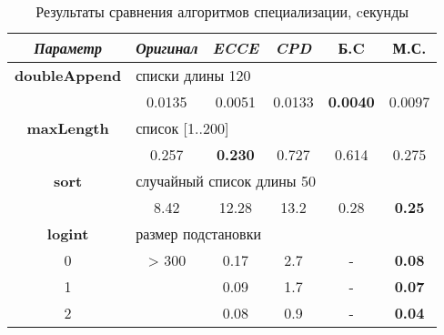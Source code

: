 \begin{table}[h!]
\center
\begin{tabular}{|c|c|c|c|c|c|}
\hline
{\it Параметр} & {\it Оригинал} & {\it ECCE }  & {\it CPD} & {\bf Б.C} & {\bf М.С.} \\ \hline
{\bf doubleAppend} & \multicolumn{5}{|l|}{списки длины 120 } \\ \hline
                   & 0.0135 & 0.0051 & 0.0133 & {\bf 0.0040} & 0.0097 \\ \hline


{\bf maxLength} & \multicolumn{5}{|l|}{список [1..200]} \\ \hline

                & 0.257 & {\bf 0.230} & 0.727 & 0.614 & 0.275 \\ \hline


{\bf sort} & \multicolumn{5}{|l|}{случайный список длины 50 } \\ \hline
         & 8.42     & 12.28 & 13.2 & 0.28  & {\bf 0.25} \\ \hline


{\bf logint} & \multicolumn{5}{|l|}{размер подстановки} \\ \hline
0 & > 300    & 0.17  & 2.7  & -  &  {\bf 0.08} \\
1 &          & 0.09  & 1.7  & -  &  {\bf 0.07} \\
2 &          & 0.08   & 0.9  & -  & {\bf 0.04} \\
\hline

\end{tabular}
\caption{Результаты сравнения алгоритмов специализации, cекунды}
\label{fig:totalResult}
\end{table}


